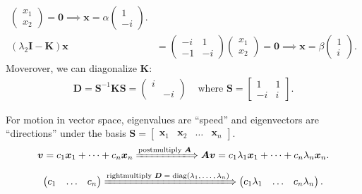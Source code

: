 \begin{example}
\begin{align*}
\begin{pmatrix}
x_1\\x_2
\end{pmatrix}=\bm 0\implies\bm x=\alpha\begin{pmatrix}
1\\-i
\end{pmatrix}.\\
(\lambda_2\bm I-\bm K)\bm x&=\begin{pmatrix}
-i&1\\-1&-i
\end{pmatrix}\begin{pmatrix}
x_1\\x_2
\end{pmatrix}=\bm 0\implies\bm x=\beta\begin{pmatrix}
1\\i
\end{pmatrix}.
\end{align*}
Moverover, we can diagonalize $\bm K$:
\[
\begin{array}{ll}
\bm D=\bm S^{-1}\bm K\bm S=\begin{pmatrix}
i&\\&-i
\end{pmatrix}
&
\mbox{ where }\bm S=\begin{bmatrix}
1&1\\-i&i
\end{bmatrix}.
\end{array}
\]
\end{example}
\begin{remark}
For motion in vector space, eigenvalues are ``speed''
 and eigenvectors are ``directions'' under the basis $\bm S=\begin{bmatrix}
\bm x_1&\bm x_2&\dots&\bm x_n
\end{bmatrix}$.
\[
\bm v=c_1\bm x_1+\dots+c_n\bm x_n
\xLongrightarrow{\text{postmultiply $\bm A$}}\bm{Av}=c_1\lambda_1\bm x_1+\dots+c_n\lambda_n\bm x_n.
\]
\[
\begin{pmatrix}
c_1&\dots&c_n
\end{pmatrix}
\xLongrightarrow{\text{rightmultiply $\bm D=\diag(\lambda_1,\dots,\lambda_n)$}}
\begin{pmatrix}c_1\lambda_1&\dots&c_n\lambda_n
\end{pmatrix}.
\]
\end{remark}
